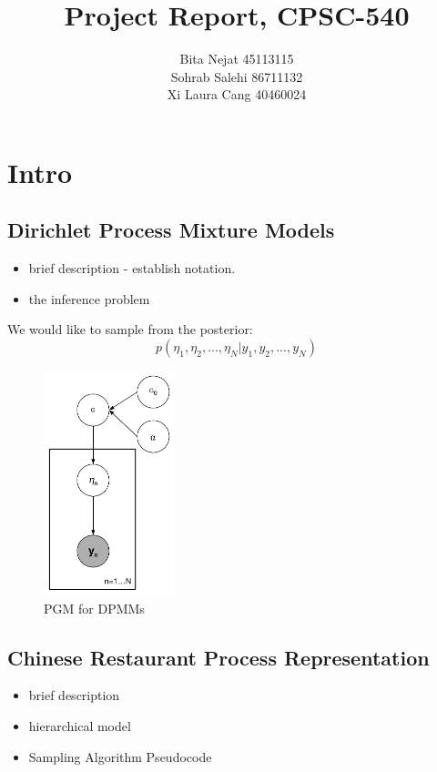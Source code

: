 \documentclass{article}
\title{Project Report, CPSC-540}
\author{
Bita Nejat 45113115 \\
Sohrab Salehi 86711132 \\
Xi Laura Cang 40460024
}
\begin{document}
\maketitle

\section{Intro}

\subsection{Dirichlet Process Mixture Models}

\begin{itemize}
	\item brief description - establish notation.
	\item the inference problem
\end{itemize}

We would like to sample from the posterior:
$$  p(\eta_1, \eta_2, ..., \eta_N | y_1, y_2, ..., y_N) $$ 

\begin{figure}[!h]
\begin{center}
  \includegraphics[width=1.5in]{dpmm_pgm}
\caption{PGM for DPMMs}
  \label{fig:dpmm_pgm}
\end{center}
\end{figure}


\subsection{Chinese Restaurant Process Representation}
\begin{itemize}
	\item brief description
	\item hierarchical model
	\item Sampling Algorithm Pseudocode \cite{neal2000markov}
\end{itemize}
\end{document}

